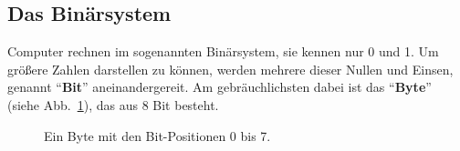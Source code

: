 \subsection{Das Binärsystem}
\label{sec:grundlage:binärsystem}

Computer rechnen im sogenannten Binärsystem, sie kennen nur 0 und 1. Um größere Zahlen darstellen zu können, werden mehrere dieser Nullen und Einsen, genannt ``\textbf{Bit}'' aneinandergereit. Am gebräuchlichsten dabei ist das ``\textbf{Byte}'' (siehe Abb.~\ref{fig:byte_bits}), das aus 8 Bit besteht.

\begin{figure}[h]
  \centering
  \caption{Ein Byte mit den Bit-Positionen 0 bis 7.}
  \label{fig:byte_bits}
\end{figure}

